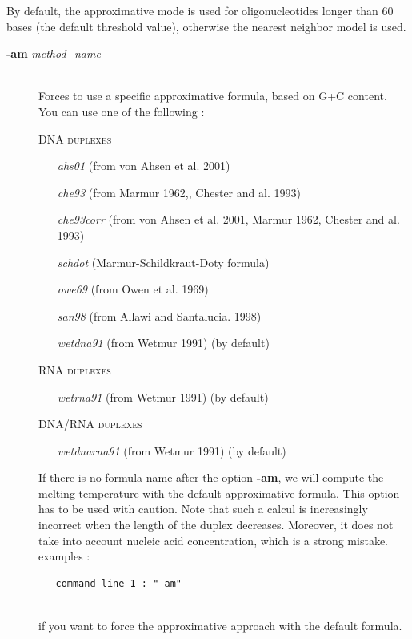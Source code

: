 \documentclass{article}
\begin{document}
By default, the approximative mode is used for oligonucleotides longer than 60 bases (the default threshold value), otherwise the nearest 
neighbor model is used. 
\begin{description}

\item [\textbf{-am} \textit{method\_name}]\mbox{}\\ 
  Forces to use a specific approximative formula, based on G+C content. You can use one of the following :
  
  \textsc{DNA duplexes}
    \begin{itemize}
    \item [\textit{ahs01}] (from von Ahsen et al. 2001)
    \item [\textit{che93}] (from Marmur 1962,, Chester and al. 1993)
    \item [\textit{che93corr}] (from von Ahsen et al. 2001, Marmur 1962, Chester and al. 1993)
    \item [\textit{schdot}] (Marmur-Schildkraut-Doty formula)
    \item [\textit{owe69}] (from Owen et al. 1969)
    \item [\textit{san98}] (from Allawi and Santalucia. 1998)
    \item [\textit{wetdna91}] (from Wetmur 1991)  (by default)
    \end{itemize}
  \textsc{RNA duplexes}
    \begin{itemize}
    \item [\textit{wetrna91}] (from Wetmur 1991)  (by default)
    \end{itemize}
  \textsc{DNA/RNA duplexes}
    \begin{itemize}
    \item [\textit{wetdnarna91}] (from Wetmur 1991)  (by default)
    \end{itemize}
  If there is no formula name after the option \textbf{-am}, we will compute the melting temperature with the default approximative formula.
  This option has to be used with caution. Note that such a calcul is increasingly incorrect when the length of  the duplex 
  decreases. Moreover, it does not take into account nucleic acid concentration, which is a strong mistake.
  examples :
  
  \begin{verbatim}
   command line 1 : "-am" 
  
  \end{verbatim}	  
  if you want to force the approximative approach with the 
  default formula.
  

\end{description}
\end{document}
